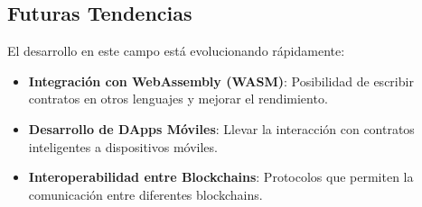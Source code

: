 \subsection{Futuras Tendencias}

El desarrollo en este campo está evolucionando rápidamente:

\begin{itemize}
    \item \textbf{Integración con WebAssembly (WASM)}: Posibilidad de escribir contratos en otros lenguajes y mejorar el rendimiento.

    \item \textbf{Desarrollo de DApps Móviles}: Llevar la interacción con contratos inteligentes a dispositivos móviles.

    \item \textbf{Interoperabilidad entre Blockchains}: Protocolos que permiten la comunicación entre diferentes blockchains.

\end{itemize}
